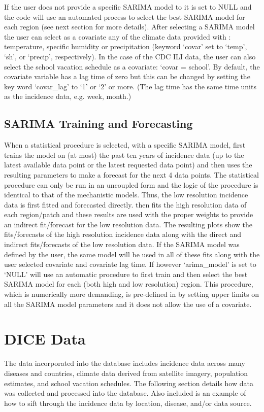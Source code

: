 \documentclass[a4paper]{article}
\begin{document}
If the user does not provide a specific SARIMA model to  it is set to NULL and the code will use an automated process to select the best SARIMA model for each region (see next section for more details).  After selecting a SARIMA model the user can select as a covariate any of the climate data provided with : temperature, specific humidity or precipitation (keyword `covar' set to `temp', `sh', or `precip', respectively).  In the case of the CDC ILI data, the user can also select the school vacation schedule as a covariate: `covar = school'.  By default, the covariate variable has a lag time of zero but this can be changed by setting the key word `covar\_lag' to `1' or `2' or more.  (The lag time has the same time units as the incidence data, e.g. week, month.)

\subsection{SARIMA Training and Forecasting}
When a statistical procedure is selected, with a specific SARIMA model,  first trains the model on (at most) the past ten years of incidence data (up to the latest available data point or the latest requested data point) and then uses the resulting parameters to make a forecast for the next 4 data points.  The statistical procedure can only be run in an uncoupled form and the logic of the procedure is identical to that of the mechanistic models.  Thus, the low resolution incidence data is first fitted and forecasted directly.   then fits the high resolution data of each region/patch and these results are used with the proper weights to provide an indirect fit/forecast for the low resolution data. The resulting plots show the fits/forecasts of the high resolution incidence data along with the direct and indirect fits/forecasts of the low resolution data.
If the SARIMA model was defined by the user, the same model will be used in all of these fits along with the user  selected covariate and covariate lag time.  If however `arima\_model' is set to `NULL'  will use an automatic procedure to first train and then select the best SARIMA model for each (both high and low resolution) region.  This procedure, which is numerically more demanding, is pre-defined in  by setting upper limits on all the SARIMA model parameters and it does not allow the use of a covariate.


\section{DICE Data}
\label{sec:data}
The data incorporated into the  database includes incidence data across many diseases and countries, climate data derived from satellite imagery, population estimates, and school vacation schedules.  The following section details how data was collected and processed into the database.  Also included is an example of how to sift through the incidence data by location, disease, and/or data source.
\end{document}
